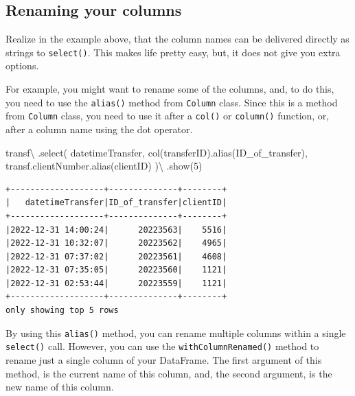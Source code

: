 \documentclass[
  11pt,
  letterpaper,
  DIV=11,
  numbers=noendperiod]{scrreprt}
\newenvironment{Shaded}{\begin{snugshade}}{\end{snugshade}}
\newcommand{\DecValTok}[1]{\textcolor[rgb]{0.68,0.00,0.00}{#1}}
\newcommand{\NormalTok}[1]{\textcolor[rgb]{0.00,0.23,0.31}{#1}}
\newcommand{\OperatorTok}[1]{\textcolor[rgb]{0.37,0.37,0.37}{#1}}
\newcommand{\StringTok}[1]{\textcolor[rgb]{0.13,0.47,0.30}{#1}}
\begin{document}
\hypertarget{renaming-your-columns}{%
\subsection{Renaming your columns}\label{renaming-your-columns}}

Realize in the example above, that the column names can be delivered
directly as strings to \texttt{select()}. This makes life pretty easy,
but, it does not give you extra options.

For example, you might want to rename some of the columns, and, to do
this, you need to use the \texttt{alias()} method from \texttt{Column}
class. Since this is a method from \texttt{Column} class, you need to
use it after a \texttt{col()} or \texttt{column()} function, or, after a
column name using the dot operator.

\begin{Shaded}
\begin{Highlighting}[]
\NormalTok{transf}\OperatorTok{\textbackslash{}}
\NormalTok{  .select(}
    \StringTok{\textquotesingle{}datetimeTransfer\textquotesingle{}}\NormalTok{,}
\NormalTok{    col(}\StringTok{\textquotesingle{}transferID\textquotesingle{}}\NormalTok{).alias(}\StringTok{\textquotesingle{}ID\_of\_transfer\textquotesingle{}}\NormalTok{),}
\NormalTok{    transf.clientNumber.alias(}\StringTok{\textquotesingle{}clientID\textquotesingle{}}\NormalTok{)}
\NormalTok{  )}\OperatorTok{\textbackslash{}}
\NormalTok{  .show(}\DecValTok{5}\NormalTok{)}
\end{Highlighting}
\end{Shaded}

\begin{verbatim}
+-------------------+--------------+--------+
|   datetimeTransfer|ID_of_transfer|clientID|
+-------------------+--------------+--------+
|2022-12-31 14:00:24|      20223563|    5516|
|2022-12-31 10:32:07|      20223562|    4965|
|2022-12-31 07:37:02|      20223561|    4608|
|2022-12-31 07:35:05|      20223560|    1121|
|2022-12-31 02:53:44|      20223559|    1121|
+-------------------+--------------+--------+
only showing top 5 rows
\end{verbatim}

By using this \texttt{alias()} method, you can rename multiple columns
within a single \texttt{select()} call. However, you can use the
\texttt{withColumnRenamed()} method to rename just a single column of
your DataFrame. The first argument of this method, is the current name
of this column, and, the second argument, is the new name of this
column.
\end{document}
